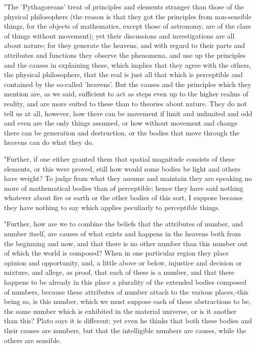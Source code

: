 "The 'Pythagoreans' treat of principles and elements stranger than
those of the physical philosophers (the reason is that they got the
principles from non-sensible things, for the objects of mathematics,
except those of astronomy, are of the class of things without movement);
yet their discussions and investigations are all about nature; for
they generate the heavens, and with regard to their parts and attributes
and functions they observe the phenomena, and use up the principles
and the causes in explaining these, which implies that they agree
with the others, the physical philosophers, that the real is just
all that which is perceptible and contained by the so-called 'heavens'.
But the causes and the principles which they mention are, as we said,
sufficient to act as steps even up to the higher realms of reality,
and are more suited to these than to theories about nature. They do
not tell us at all, however, how there can be movement if limit and
unlimited and odd and even are the only things assumed, or how without
movement and change there can be generation and destruction, or the
bodies that move through the heavens can do what they do.

"Further, if one either granted them that spatial magnitude consists
of these elements, or this were proved, still how would some bodies
be light and others have weight? To judge from what they assume and
maintain they are speaking no more of mathematical bodies than of
perceptible; hence they have said nothing whatever about fire or earth
or the other bodies of this sort, I suppose because they have nothing
to say which applies peculiarly to perceptible things. 

"Further, how are we to combine the beliefs that the attributes of
number, and number itself, are causes of what exists and happens in
the heavens both from the beginning and now, and that there is no
other number than this number out of which the world is composed?
When in one particular region they place opinion and opportunity,
and, a little above or below, injustice and decision or mixture, and
allege, as proof, that each of these is a number, and that there happens
to be already in this place a plurality of the extended bodies composed
of numbers, because these attributes of number attach to the various
places,-this being so, is this number, which we must suppose each
of these abstractions to be, the same number which is exhibited in
the material universe, or is it another than this? Plato says it is
different; yet even he thinks that both these bodies and their causes
are numbers, but that the intelligible numbers are causes, while the
others are sensible. 

